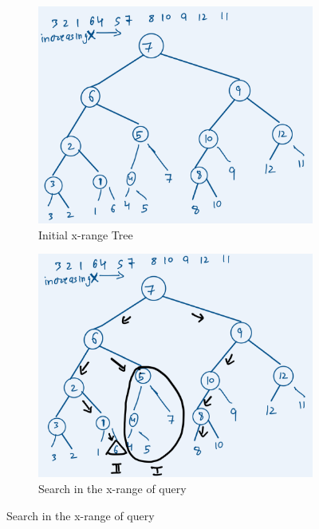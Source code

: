 \begin{figure}[H]
     \centering
     \begin{subfigure}[b]{0.45\textwidth}
         \centering
         \includegraphics[width=\textwidth]{Images/2dinit.jpg}
         \caption{Initial x-range Tree}
         \label{fig:2dinit}
     \end{subfigure}
     \hfill
     \begin{subfigure}[b]{0.45\textwidth}
         \centering
         \includegraphics[width=\textwidth]{Images/2dfin.jpg}
         \caption{Search in the x-range of query}
         \label{fig:2dfin}
     \end{subfigure}


\end{figure}
